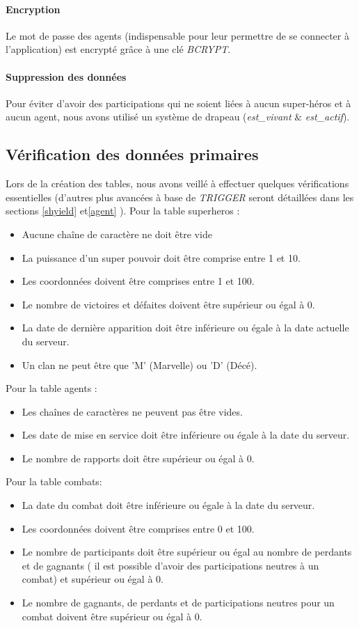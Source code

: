 \documentclass{article}[12pt]
\begin{document}
	\paragraph{Encryption}
	Le mot de passe des agents (indispensable pour leur permettre de se connecter à l'application) est encrypté grâce à une clé \textit{BCRYPT}.
	\paragraph{Suppression des données}
	Pour éviter d'avoir des participations qui ne soient liées à aucun super-héros et à aucun agent, nous avons utilisé un système de drapeau (\textit{est\_vivant} \& \textit{est\_actif}).
	
	\subsection{Vérification des données primaires}
	Lors de la création des tables, nous avons veillé à effectuer quelques vérifications essentielles (d'autres plus avancées à base de \textit{TRIGGER} seront détaillées dans les sections \ref{shyield} et\ref{agent} ).
	Pour la table superheros : 
	\begin{itemize}
		\item Aucune chaîne de caractère ne doit être vide
		\item La puissance d'un super pouvoir doit être comprise entre 1 et 10.
		\item Les coordonnées doivent être comprises entre 1 et 100.
		\item Le nombre de victoires et défaites doivent être supérieur ou égal à 0.
		\item La date de dernière apparition doit être inférieure ou égale à la date actuelle du serveur.
		\item Un clan ne peut être que 'M' (Marvelle) ou 'D' (Décé).
	\end{itemize}
	Pour la table agents :
	\begin{itemize}
		\item Les chaînes de caractères ne peuvent pas être vides.
		\item Les date de mise en service doit être inférieure ou égale à la date du serveur.
		\item Le nombre de rapports doit être supérieur ou égal à 0.
	\end{itemize}
	Pour la table combats:
	\begin{itemize}
		\item La date du combat doit être inférieure  ou égale à la date du serveur.
		\item Les coordonnées doivent être comprises entre 0 et 100.
		\item Le nombre de participants doit être supérieur ou égal au nombre de perdants et de gagnants ( il est possible d'avoir des participations neutres à un combat) et supérieur ou égal à 0.
		\item Le nombre de gagnants, de perdants et de participations neutres pour un combat doivent être supérieur ou égal à 0.
	\end{itemize}
\end{document}
